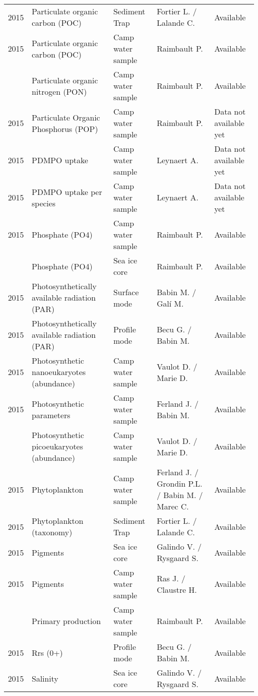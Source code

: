 \documentclass[]{article}
\begin{document}
\begin{landscape}
\begin{longtable}{rllll}
2015 & Particulate organic carbon (POC) & Sediment Trap & Fortier L. / Lalande C. & Available\\
2015 & Particulate organic carbon (POC) & Camp water sample & Raimbault P. & Available\\
\addlinespace
2015 & Particulate organic nitrogen (PON) & Camp water sample & Raimbault P. & Available\\
2015 & Particulate Organic Phosphorus (POP) & Camp water sample & Raimbault P. & Data not available yet\\
2015 & PDMPO uptake & Camp water sample & Leynaert A. & Data not available yet\\
2015 & PDMPO uptake per species & Camp water sample & Leynaert A. & Data not available yet\\
2015 & Phosphate (PO4) & Camp water sample & Raimbault P. & Available\\
\addlinespace
2015 & Phosphate (PO4) & Sea ice core & Raimbault P. & Available\\
2015 & Photosynthetically available radiation (PAR) & Surface mode & Babin M. / Galí M. & Available\\
2015 & Photosynthetically available radiation (PAR) & Profile mode & Becu G. / Babin M. & Available\\
2015 & Photosynthetic nanoeukaryotes (abundance) & Camp water sample & Vaulot D. / Marie D. & Available\\
2015 & Photosynthetic parameters & Camp water sample & Ferland J. / Babin M. & Available\\
\addlinespace
2015 & Photosynthetic picoeukaryotes (abundance) & Camp water sample & Vaulot D. / Marie D. & Available\\
2015 & Phytoplankton & Camp water sample & Ferland J. / Grondin P.L. / Babin M. / Marec C. & Available\\
2015 & Phytoplankton (taxonomy) & Sediment Trap & Fortier L. / Lalande C. & Available\\
2015 & Pigments & Sea ice core & Galindo V. / Rysgaard S. & Available\\
2015 & Pigments & Camp water sample & Ras J. / Claustre H. & Available\\
\addlinespace
2015 & Primary production & Camp water sample & Raimbault P. & Available\\
2015 & Rrs (0+) & Profile mode & Becu G. / Babin M. & Available\\
2015 & Salinity & Sea ice core & Galindo V. / Rysgaard S. & Available\\

\end{longtable}
\end{landscape}
\end{document}
